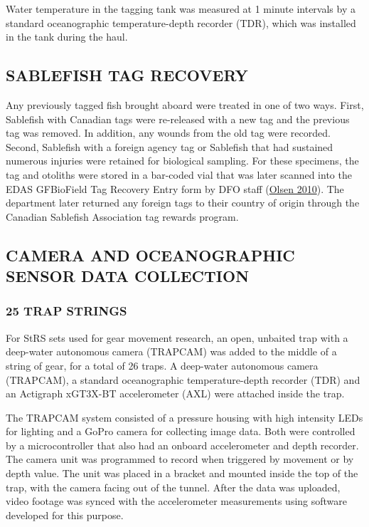 \documentclass[12pt]{article}\usepackage[]{graphicx}\usepackage[]{color}
\begin{document}
Water temperature in the tagging tank was measured at 1 minute intervals by a standard oceanographic temperature-depth recorder (TDR), which was installed in the tank during the haul.

\hypertarget{sablefish-tag-recovery}{%
\subsection{SABLEFISH TAG RECOVERY}\label{sablefish-tag-recovery}}

Any previously tagged fish brought aboard were treated in one of two ways. First, Sablefish with Canadian tags were re-released with a new tag and the previous tag was removed. In addition, any wounds from the old tag were recorded. Second, Sablefish with a foreign agency tag or Sablefish that had sustained numerous injuries were retained for biological sampling. For these specimens, the tag and otoliths were stored in a bar-coded vial that was later scanned into the EDAS GFBioField Tag Recovery Entry form by DFO staff (\protect\hyperlink{ref-Olsen2010}{Olsen 2010}). The department later returned any foreign tags to their country of origin through the Canadian Sablefish Association tag rewards program.

\hypertarget{camera-and-oceanographic-sensor-data-collection}{%
\subsection{CAMERA AND OCEANOGRAPHIC SENSOR DATA COLLECTION}\label{camera-and-oceanographic-sensor-data-collection}}

\hypertarget{twenty-fivetraps}{%
\subsubsection{25 TRAP STRINGS}\label{twenty-fivetraps}}

For StRS sets used for gear movement research, an open, unbaited trap with a deep-water autonomous camera (TRAPCAM) was added to the middle of a string of gear, for a total of 26 traps. A deep-water autonomous camera (TRAPCAM), a standard oceanographic temperature-depth recorder (TDR) and an Actigraph xGT3X-BT accelerometer (AXL) were attached inside the trap.

The TRAPCAM system consisted of a pressure housing with high intensity LEDs for lighting and a GoPro camera for collecting image data. Both were controlled by a microcontroller that also had an onboard accelerometer and depth recorder. The camera unit was programmed to record when triggered by movement or by depth value. The unit was placed in a bracket and mounted inside the top of the trap, with the camera facing out of the tunnel. After the data was uploaded, video footage was synced with the accelerometer measurements using software developed for this purpose.
\end{document}
